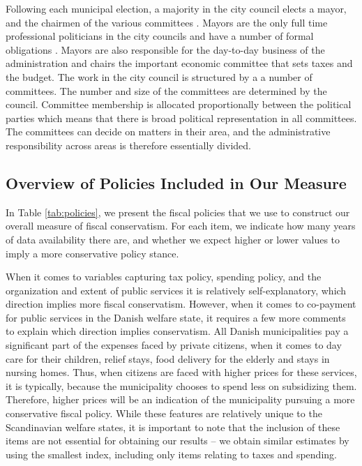 \documentclass[a4paper,12pt]{article}
\begin{document}
Following each municipal election, a majority in the city council elects a mayor, and the chairmen of the various committees \citep{serritzlew2008explaining}. Mayors are the only full time professional politicians in the city councils and have a number of formal obligations \citep{kjaer2015urban}. Mayors are also responsible for the day-to-day business of the administration and chairs the important economic committee that sets taxes and the budget. The work in the city council is structured by a a number of committees. The number and size of the committees are determined by the council. Committee membership is allocated proportionally between the political parties which means that there is broad political representation in all committees. The committees can decide on matters in their area, and the administrative responsibility across areas is therefore essentially divided. 

\clearpage

\subsection{Overview of Policies Included in Our Measure} \label{policy}


\setcounter{table}{0}
\setcounter{figure}{0}

In Table \ref{tab:policies}, we present the fiscal policies that we use to construct our overall measure of fiscal conservatism. For each item, we indicate how many years of data availability there are, and whether we expect higher or lower values to imply a more conservative policy stance. 

When it comes to variables capturing tax policy, spending policy, and the organization and extent of public services it is relatively self-explanatory, which direction implies more fiscal conservatism. However, when it comes to co-payment for public services in the Danish welfare state, it requires a few more comments to explain which direction implies conservatism. All Danish municipalities pay a significant part of the expenses faced by private citizens, when it comes to day care for their children, relief stays, food delivery for the elderly and stays in nursing homes. Thus, when citizens are faced with higher prices for these services, it is typically, because the municipality chooses to spend less on subsidizing them. Therefore, higher prices will be an indication of the municipality pursuing a more conservative fiscal policy. While these features are relatively unique to the Scandinavian welfare states, it is important to note that the inclusion of these items are not essential for obtaining our results -- we obtain similar estimates by using the smallest index, including only items relating to taxes and spending.
\end{document}
